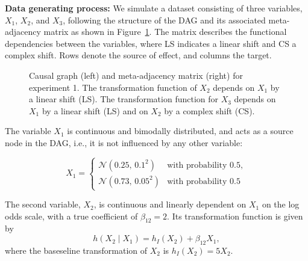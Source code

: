 \textbf{Data generating process: } We simulate a dataset consisting of three variables, \(X_1\), \(X_2\), and \(X_3\), following the structure of the DAG and its associated meta-adjacency matrix as shown in Figure~\ref{fig:dag_and_matrix}. The matrix describes the functional dependencies between the variables, where LS indicates a linear shift and CS a complex shift. Rows denote the source of effect, and columns the target.

\begin{figure}[H]
\centering
{}
\caption{Causal graph (left) and meta-adjacency matrix (right) for experiment 1. The transformation function of $X_2$ depends on $X_1$ by a linear shift (LS). The transformation function for $X_3$ depends on $X_1$ by a linear shift (LS) and on $X_2$ by a complex shift (CS).}
\label{fig:dag_and_matrix}
\end{figure}

The variable \(X_1\) is continuous and bimodally distributed, and acts as a source node in the DAG, i.e., it is not influenced by any other variable:

\[
X_1 = 
\begin{cases}
\mathcal{N}(0.25,\, 0.1^2) & \text{with probability } 0.5, \\
\mathcal{N}(0.73,\, 0.05^2) & \text{with probability } 0.5
\end{cases}
\]


    
The second variable, \(X_2\), is continuous and linearly dependent on \(X_1\) on the log odds scale, with a true coefficient of \(\beta_{12} = 2\). Its transformation function is given by  
\[
h(X_2 \mid X_1) = h_I(X_2) + \beta_{12} X_1,
\]
where the baseseline transformation of \(X_2\) is \(h_I(X_2) = 5 X_2\).

